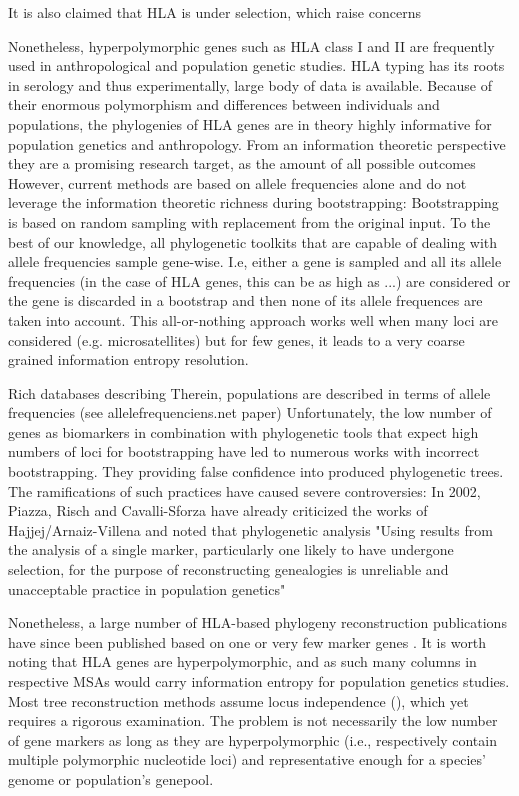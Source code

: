 \documentclass{article}
\begin{document}
It is also claimed that HLA is under selection, which raise concerns %


Nonetheless, hyperpolymorphic genes such as HLA class I and II are frequently used in anthropological and population genetic studies.
HLA typing has its roots in serology and thus experimentally, large body of data is available.
Because of their enormous polymorphism and differences between individuals and populations, the phylogenies of HLA genes
are in theory highly informative for population genetics and anthropology. From an information theoretic perspective
they are a promising research target, as the amount of all possible outcomes
However, current methods are based on allele frequencies alone and do not leverage the information theoretic richness during bootstrapping:
Bootstrapping is based on random sampling with replacement from the original input. To the best of our knowledge,
all phylogenetic toolkits that are capable of dealing with allele frequencies sample gene-wise.
I.e, either a gene is sampled and all its allele frequencies (in the case of HLA genes, this can be as high as ...)
are considered or the gene is discarded in a bootstrap and then none of its allele frequences are taken into
account. This all-or-nothing approach works well when many loci are considered (e.g. microsatellites)
but for few genes, it leads to a very coarse grained information entropy resolution.

Rich databases describing
Therein, populations are described in terms of allele frequencies (see allelefrequenciens.net paper)
Unfortunately, the low number of genes as biomarkers in combination with phylogenetic tools that expect high numbers of
loci for bootstrapping have led to numerous works with incorrect bootstrapping.
They providing false confidence into produced phylogenetic trees. The ramifications of such practices have caused
severe controversies:
In 2002, Piazza, Risch and Cavalli-Sforza \cite{Risch2002Jan} have already criticized the works of Hajjej/Arnaiz-Villena and noted that
phylogenetic analysis  "Using results from the analysis of a single marker, particularly one likely to
have undergone selection, for the purpose of reconstructing genealogies is unreliable and unacceptable
practice in population genetics"

Nonetheless, a large number of HLA-based phylogeny reconstruction publications have since been  published based on one
or very few marker genes \cite{Hajjej2018Mar,arnaiz2001hla,Arnaiz-Villena2017Jan, Zha}.
It is worth noting that HLA genes are hyperpolymorphic, and as such many columns in respective MSAs would carry
information entropy for population genetics studies. Most tree reconstruction methods assume locus independence
(\cite{Efron1996Nov}), which yet requires a rigorous examination. The problem is not necessarily the low number of
gene markers as long as they are hyperpolymorphic (i.e., respectively contain multiple polymorphic nucleotide loci)
and representative enough for a species' genome or population's genepool.
\end{document}
